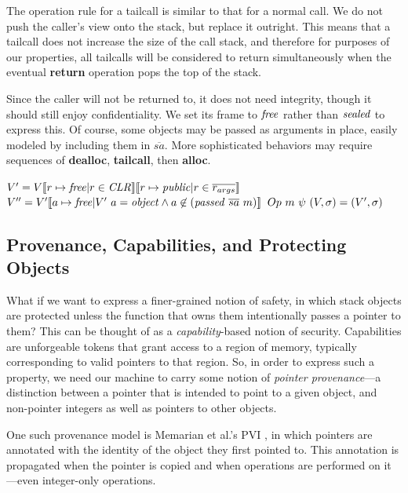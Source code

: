 \documentclass[10pt,conference]{ieeetran}%
\theoremstyle{definition}
\begin{document}
The operation rule for a tailcall is similar to that for a normal call.
We do not push the caller's view onto the stack,
but replace it outright. This means that a tailcall does not increase the size of
the call stack, and therefore for purposes of our properties, all tailcalls will
be considered to return simultaneously when the eventual {\bf return} operation
pops the top of the stack.

Since the caller will not be returned to, it does not need integrity, though
it should still enjoy confidentiality. We set its frame to \(\mathit{free}\) rather
than \(\mathit{sealed}\) to express this. Of course, some objects may be passed as arguments
in place, easily modeled by including them in \(\overline{sa}\). More sophisticated
behaviors may require sequences of {\bf dealloc}, {\bf tailcall}, then {\bf alloc}.

             {\(V' = V \llbracket r \mapsto \mathit{free} | r \in \mathit{CLR} \rrbracket
               \llbracket r \mapsto \mathit{public} | r \in \overline{r_{args}} \rrbracket\)}
             {\(V'' = V'\llbracket a \mapsto \mathit{free} | V' ~ a = \mathit{object} \land a \not \in (\mathit{passed} ~ \overline{sa} ~ m) \rrbracket\)}
             {\(Op ~ m ~ \psi ~ (V,\sigma) =
               (V',\sigma)\)}
             
\subsection{Provenance, Capabilities, and Protecting Objects}

What if we want to express a finer-grained notion of safety, in which
stack objects are protected unless the function that owns them intentionally
passes a pointer to them? This can be thought of as a {\it capability}-based
notion of security. Capabilities are unforgeable tokens that grant access to
a region of memory, typically corresponding to valid pointers to that region.
So, in order to express such a property, we need our machine to carry some notion
of {\it pointer provenance}---a distinction between a pointer that is intended to
point to a given object, and non-pointer integers as well as pointers to other objects.

One such provenance model is Memarian et al.'s PVI \cite{}, in which pointers are
annotated with the identity of the object they first pointed to. This annotation is
propagated when the pointer is copied and when operations are performed on it---even
integer-only operations.
\end{document}
